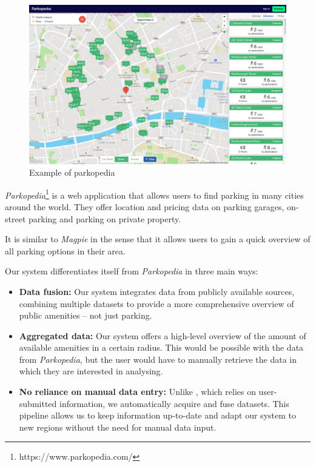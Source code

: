 \begin{figure}[htbp]
  \centering
  \includegraphics[width=\columnwidth]{images/parkopedia.png}
  \caption{Example of parkopedia}
  \label{fig:parkopedia}
\end{figure}

\textit{Parkopedia}\footnote{https://www.parkopedia.com/} is a web
application that allows users to find parking in many cities around the world.
They offer location and pricing data on parking garages, on-street parking and
parking on private property.

It is similar to \textit{Magpie} in the sense that it allows users to
gain a quick overview of all parking options in their area.

Our system differentiates itself from \textit{Parkopedia} in three
main ways:
\vspace{-3mm}
\begin{itemize}
  \item{\textbf{Data fusion:} Our system integrates data from publicly available
  sources, combining multiple datasets to provide a more comprehensive overview
  of public amenities -- not just parking.}
  \vspace{1.25mm}

  \item{\textbf{Aggregated data:} Our system offers a high-level overview of the
  amount of available amenities in a certain radius. This would be possible with
  the data from \textit{Parkopedia}, but the user would have to manually
  retrieve the data in which they are interested in analysing.}
  \vspace{1.25mm}

  \item{\textbf{No reliance on manual data entry:} Unlike
  , which relies on user-submitted information, we
  automatically acquire and fuse datasets. This pipeline allows us to keep
  information up-to-date and adapt our system to new regions without the need
  for manual data input.}
  \vspace{1.25mm}

\end{itemize}

